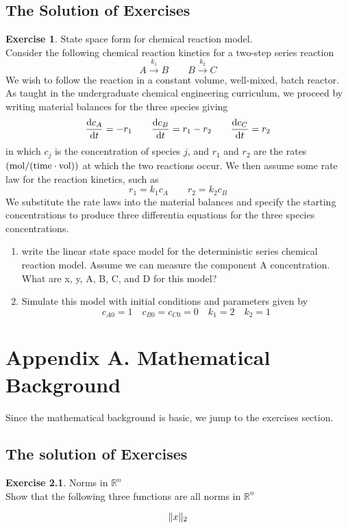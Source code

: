 \documentclass[11pt,a4paper]{report}
\theoremstyle{definition}\newtheorem{exercise}{Exercise}[chapter]
\begin{document}
\section{The Solution of Exercises}
\begin{exercise} State space form for chemical reaction model.\\
Consider the following chemical reaction kinetics for a two-step series reaction
\begin{equation}
    A\xrightarrow{k_1} B\qquad B\xrightarrow{k_2} C
\end{equation}
We wish to follow the reaction in a constant volume, well-mixed, batch reactor. As taught in the undergraduate chemical engineering curriculum, we proceed by writing material balances for the three species giving
\begin{equation}
    \dv{c_A}{t}=-r_1\qquad \dv{c_B}{t}=r_1-r_2\qquad \dv{c_C}{t}=r_2
\end{equation}
in which $c_j$ is the concentration of species $j$, and $r_1$ and $r_2$ are the rates $\rm (mol/(time\cdot vol))$ at which the two reactions occur. We then assume some rate law for the reaction kinetics, such as
\begin{equation}
    r_1=k_1 c_A\qquad r_2=k_2 c_B
\end{equation}
We substitute the rate laws into the material balances and specify the starting concentrations to produce three differentia equations for the three species concentrations. 

\begin{enumerate}[label=(\alph*)]
    \item write the linear state space model for the deterministic series chemical reaction model. Assume we can measure the component A concentration. What are x, y, A, B, C, and D for this model?
    \item Simulate this model with initial conditions and parameters given by $$c_{A0}=1\quad c_{B0}=c_{C0}=0\quad k_1=2\quad k_2=1$$
\end{enumerate}
\end{exercise}
\begin{answer}

\end{answer}



\chapter{Appendix A. Mathematical Background}
Since the mathematical background is basic, we jump to the exercises section.
\section{The solution of Exercises}
\begin{exercise} Norms in $\mathbb{R}^n$\\
Show that the following three functions are all norms in $\mathbb{R}^n$

\begin{equation}\notag
    \|x\|_2 
\end{equation}

\end{exercise}
\end{document}
